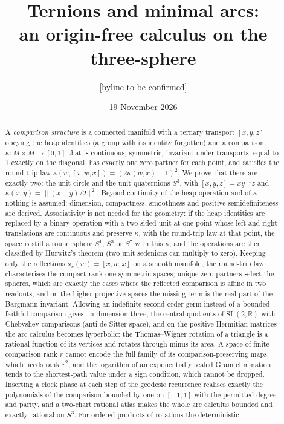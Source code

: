 \documentclass[11pt,reqno]{amsart}
\title[Ternions and minimal arcs]{Ternions and minimal arcs:\\ an origin-free calculus on the three-sphere}
\author{[byline to be confirmed]}
\date{19 November 2026}
\theoremstyle{definition}
\theoremstyle{remark}
\numberwithin{equation}{section}
\newcommand{\R}{\mathbb{R}}
\newcommand{\hp}[3]{[#1,#2,#3]}
\begin{document}
\raggedbottom

\begin{abstract}
A \emph{comparison structure} is a connected manifold with a ternary transport $\hp xyz$ obeying the
heap identities (a group with its identity forgotten) and a comparison $\kappa\colon M\times M\to[0,1]$ that is continuous,
symmetric, invariant under transports, equal to $1$ exactly on the diagonal, has exactly one zero partner for each point, and
satisfies the round-trip law $\kappa(w,\hp xwx)=(2\kappa(w,x)-1)^2$.  We prove that there are exactly two: the unit circle and the
unit quaternions $S^3$, with $\hp xyz=xy^{-1}z$ and $\kappa(x,y)=\lVert(x+y)/2\rVert^2$.  Beyond continuity of the heap operation and of
$\kappa$ nothing is assumed: dimension, compactness, smoothness and positive semidefiniteness are derived.  Associativity is not needed for the
geometry: if the heap identities are replaced by a binary operation with a two-sided unit at one point whose left and right
translations are continuous and preserve $\kappa$, with the round-trip law at that point, the space is still a round sphere $S^1$, $S^3$ or $S^7$ with
this $\kappa$, and the operations are then classified by Hurwitz's theorem (two unit sedenions can multiply to zero).  Keeping only the reflections $s_x(w)=\hp xwx$ on a smooth manifold, the
round-trip law characterises the compact rank-one symmetric spaces; unique zero partners select the spheres, which are exactly the cases
where the reflected comparison is affine in two readouts, and on the higher projective spaces the missing term is the real part of the
Bargmann invariant.  Allowing an indefinite second-order germ instead of a bounded faithful comparison gives, in dimension three, the
central quotients of $\widetilde{\mathrm{SL}}(2,\R)$ with Chebyshev comparisons (anti-de Sitter space), and on the positive Hermitian
matrices the arc calculus becomes hyperbolic: the Thomas--Wigner rotation of a triangle is a rational function of its vertices and
rotates through minus its area.  A space of finite comparison rank $r$ cannot encode the full family of its
comparison-preserving maps, which needs rank $r^2$; and the logarithm of an exponentially scaled Gram elimination tends to the
shortest-path value under a sign condition, which cannot be dropped.  Inserting a clock phase at each step of the geodesic recurrence
realises exactly the polynomials of the comparison bounded by one on $[-1,1]$ with the permitted degree and parity, and a two-chart
rational atlas makes the whole arc calculus bounded and exactly rational on $S^3$.  For ordered products of rotations the deterministic

\end{abstract}
\end{document}
